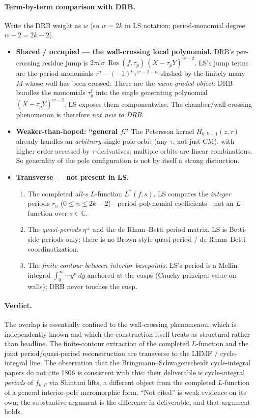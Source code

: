 \documentclass[11pt]{article}
\newcommand{\C}{\mathbb{C}}
\newcommand{\Res}{\operatorname{Res}}
\newcommand{\Lstar}{L^{*}}
\newcommand{\taup}{\tau_p}
\begin{document}
\paragraph{Term-by-term comparison with DRB.}
Write the DRB weight as $w$ (so $w=2k$ in LS notation; period-monomial degree $w-2=2k-2$).
\begin{itemize}[leftmargin=1.4em]
\item \textbf{Shared / occupied --- the wall-crossing local polynomial.} DRB's
per-crossing residue jump is $2\pi i\,\sigma\,\Res(f,\taup)\,(X-\taup Y)^{w-2}$. LS's jump
terms are the period-monomials $\tau^n-(-1)^n\tau^{w-2-n}$ slashed by the finitely many
$M$ whose wall has been crossed. These are the \emph{same graded object}: DRB bundles the
monomials $\taup^{\ell}$ into the single generating polynomial $(X-\taup Y)^{w-2}$; LS
exposes them componentwise. The chamber/wall-crossing phenomenon is therefore \emph{not
new to DRB}.
\item \textbf{Weaker-than-hoped: ``general $f$.''} The Petersson kernel $H_{k,k-1}(z,\tau)$
already handles an \emph{arbitrary} single pole orbit (any $\tau$, not just CM), with
higher order accessed by $\tau$-derivatives; multiple orbits are linear combinations. So
generality of the pole configuration is not by itself a strong distinction.
\item \textbf{Transverse --- not present in LS.}
  \begin{enumerate}[label=(\roman*),leftmargin=1.8em]
  \item The completed \emph{all-$s$} $L$-function $\Lstar(f,s)$. LS computes the
  \emph{integer} periods $r_n$ ($0\le n\le 2k-2$)---period-polynomial coefficients---not
  an $L$-function over $s\in\C$.
  \item The \emph{quasi-periods} $\eta^{\pm}$ and the de Rham--Betti period matrix. LS is
  Betti-side periods only; there is no Brown-style quasi-period / de Rham--Betti
  coordinatization.
  \item The \emph{finite contour between interior basepoints}. LS's period is a Mellin
  integral $\int_0^\infty\!\cdots y^n\,dy$ anchored at the cusps (Cauchy principal value on
  walls); DRB never touches the cusp.
  \end{enumerate}
\end{itemize}

\paragraph{Verdict.}
The overlap is essentially confined to the wall-crossing phenomenon, which is
independently known and which the construction itself treats as structural rather than
headline. The finite-contour extraction of the completed $L$-function and the joint
period/quasi-period reconstruction are transverse to the LHMF / cycle-integral line. The
observation that the Bringmann--Schwagenscheidt cycle-integral papers do not cite 1806 is
consistent with this: their deliverable is cycle-integral \emph{periods} of $f_{k,P}$ via
Shintani lifts, a different object from the completed $L$-function of a general
interior-pole meromorphic form. ``Not cited'' is weak evidence on its own; the substantive
argument is the difference in deliverable, and that argument holds.
\end{document}
